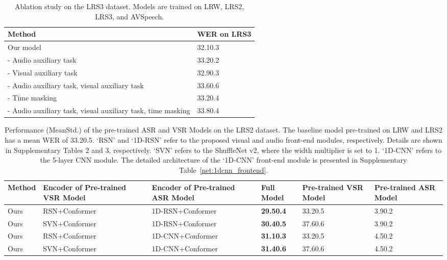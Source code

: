 \documentclass[twocolumn]{article}
\begin{document}
\begin{table*}[!t]
\centering
\caption{Ablation study on the LRS3 dataset. Models are trained on LRW, LRS2, LRS3, and AVSpeech.}
\renewcommand\arraystretch{1.15}
\begin{tabularx}{\textwidth}{u y}
\toprule
Method &WER on LRS3 \\
\midrule\midrule
Our model   & 32.10.3 \\
\midrule
- Audio auxiliary task   &33.20.2 \\
\midrule
- Visual auxiliary task  &32.90.3 \\
\midrule
- Audio auxiliary task, visual auxiliary task &33.60.6 \\
\midrule
- Time masking  &33.20.4 \\
\midrule
- Audio auxiliary task, visual auxiliary task, time masking &33.80.4 \\
\bottomrule
\end{tabularx}
\label{tab: ablation_study_on_lrs3_large_training_sets}
\end{table*} \begin{table*}[!ht]
\caption{Performance (MeanStd.) of the pre-trained ASR and VSR Models on the LRS2 dataset. The baseline  model pre-trained on LRW and LRS2 has a mean WER of 33.20.5. `RSN' and `1D-RSN' refer to the proposed visual and audio front-end modules, respectively. Details are shown in Supplementary Tables 2 and 3, respectively. `SVN' refers to the ShuffleNet v2, where the width multiplier is set to 1. `1D-CNN' refers to the 5-layer CNN module. The detailed architecture of the `1D-CNN' front-end module is presented in Supplementary Table~\ref{net:1dcnn_frontend}.}
\renewcommand\arraystretch{1}
\begin{tabularx}{\linewidth}{l j j y y y }
\toprule
    Method 
    &Encoder of Pre-trained VSR Model
    &Encoder of Pre-trained ASR Model
    &Full Model
    &Pre-trained VSR Model
    &Pre-trained ASR Model \\
\midrule
\midrule
Ours &RSN+Conformer &1D-RSN+Conformer  &\bf 29.50.4
&33.20.5 &3.90.2
\\
\midrule
Ours &SVN+Conformer &1D-RSN+Conformer  &\bf 30.40.5 &37.60.6 &3.90.2
\\
\midrule
Ours &RSN+Conformer &1D-CNN+Conformer  &\bf 31.10.3 &33.20.5 &4.50.2
\\
\midrule
Ours &SVN+Conformer &1D-CNN+Conformer  &\bf 31.40.6 &37.60.6 &4.50.2 \\
\bottomrule
\end{tabularx}
\label{tab: ablation_study_on_premodels_results_lrs2}
\end{table*}
\end{document}
